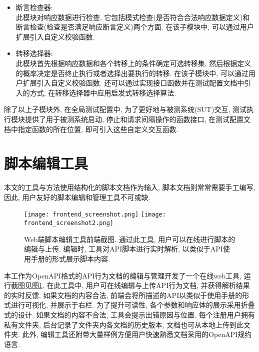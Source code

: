 \begin{itemize}
	            \item 断言检查器:\\
	                此模块对响应数据进行检查, 它包括模式检查(是否符合合法响应数据定义)和断言检查(检查是否满足响应断言定义)两个方面. 在该子模块中, 可以通过用户扩展引入自定义校验函数.
	                
	            \item 转移选择器:\\
	                此模块首先根据响应数据和各个转移上的条件确定可选转移集, 然后根据定义的概率决定是否终止执行或者选择出要执行的转移. 在该子模块中, 可以通过用户扩展引入自定义校验函数. 还可以通过实现接口函数并在测试配置文档中引入的方式, 在转移选择器中应用启发式转移选择算法.
	        \end{itemize}
	    
	        除了以上子模块外, 在全局测试配置中, 为了更好地与被测系统(SUT)交互, 测试执行模块提供了用于被测系统启动, 停止和请求间隔操作的函数接口, 在测试配置文档中指定函数的所在位置, 即可引入这些自定义交互函数.

	\section{脚本编辑工具}

        本文的工具与方法使用结构化的脚本文档作为输入, 脚本文档则常常需要手工编写, 因此, 用户友好的脚本编辑和管理工具不可或缺.
        
        \begin{figure}[!htb]
            \centering
            \texttt{[image: frontend\_screenshot.png]}
            \texttt{[image: frontend\_screenshot2.png]}
            \caption[Web端脚本编辑工具前端截图]{Web端脚本编辑工具前端截图. 通过此工具, 用户可以在线进行脚本的编辑与上传. 编辑时, 工具对API脚本进行实时解析, 以类似于API使用手册的形式展示脚本内容.}
            \label{fig:frontend_screenshot}
        \end{figure}
        
        本工作为OpenAPI格式的API行为文档的编辑与管理开发了一个在线web工具, 运行截图见图\ref{fig:frontend_screenshot}. 在此工具中, 用户可在线编辑与上传API行为文档, 并获得解析结果的实时反馈. 如果文档的内容合法, 前端会将所描述的API以类似于使用手册的形式进行可视化, 并展示于右栏. 为了提升可读性, 各个参数和响应体的展示采用折叠式的设计. 如果文档的内容不合法, 工具会提示出错原因与位置. 每个注册用户拥有私有文件夹, 后台记录了文件夹内各文档的历史版本, 文档也可从本地上传到此文件夹. 此外, 编辑工具还附带大量样例方便用户快速熟悉文档采用的OpenAPI规约语言.
        

